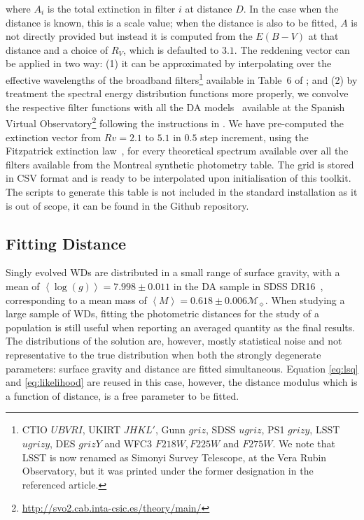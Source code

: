 \documentclass[fleqn,usenatbib]{rasti}
\newcommand{\msun}{\mathcal{M}_{\sun}}
\begin{document}
where $A_i$ is the total extinction in filter $i$ at distance $D$. In the case
when the distance is known, this is a scale value; when the distance is also
to be fitted, $A$ is not directly provided but instead it is computed from the
$E(B-V)$ at that distance and a choice of $R_{V}$, which is defaulted to $3.1$.
The reddening vector can be applied in two way: (1) it can be approximated by
interpolating over the effective wavelengths of the broadband
filters\footnote{CTIO $UBVRI$, UKIRT $JHKL'$, Gunn $griz$, SDSS $ugriz$,
PS1 $grizy$, LSST $ugrizy$, DES $grizY$ and WFC3 $F218W, F225W$ and $F275W$.
We note that LSST is now renamed as Simonyi Survey Telescope, at the Vera Rubin
Observatory, but it was printed under the former designation in the referenced
article.} available in Table~6 of \citet{2011ApJ...737..103S}; and (2) by
treatment the spectral energy distribution functions more properly, we convolve
the respective filter functions with all the DA
models~\citep{2009ApJ...696.1755T, 2010MmSAI..81..921K} available at the
Spanish Virtual
Observatory\footnote{\url{http://svo2.cab.inta-csic.es/theory/main/}} following
the instructions in \citet{2011ApJ...737..103S}. We have pre-computed the
extinction vector from $Rv = 2.1$ to $5.1$ in $0.5$ step increment, using the
Fitzpatrick extinction law~\citep{1999PASP..111...63F}, for every theoretical
spectrum available over all the filters available from the Montreal synthetic
photometry table. The grid is stored in CSV format and is ready to be
interpolated upon initialisation of this toolkit. The scripts to generate this
table is not included in the standard installation as it is out of scope, it
can be found in the Github repository.

\subsection{Fitting Distance}
Singly evolved WDs are distributed in a small range of surface gravity, with a
mean of $\left<\log(g)\right> = 7.998 \pm 0.011$ in the DA sample in SDSS
DR16~\citep{2021MNRAS.507.4646K}, corresponding to a mean mass of
$\left<M\right> = 0.618 \pm 0.006 \msun$. When studying a large sample of WDs,
fitting the photometric distances for the study of a population is still
useful when reporting an averaged quantity as the final results. The
distributions of the solution are, however, mostly statistical noise and not
representative to the true distribution when both the strongly degenerate
parameters: surface gravity and distance are fitted simultaneous. Equation
\ref{eq:lsq} and \ref{eq:likelihood} are reused in this case, however, the
distance modulus which is a function of distance, is a free parameter to be
fitted.
\end{document}
